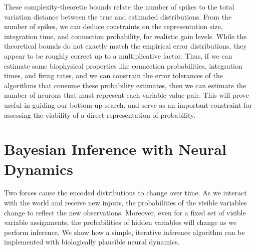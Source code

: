 These complexity-theoretic bounds relate the number of spikes to the 
total variation distance between the true and estimated distributions.
From the number of spikes, we can deduce constraints on the representation
size, integration time, and connection probability, for realistic gain levels.
While the theoretical bounds do not exactly match the empirical error 
distributions, they appear to be roughly correct up to a multiplicative 
factor. Thus, if we can estimate some biophysical properties like 
connection probabilities, integration times, and firing rates, 
and we can constrain the error 
tolerances of the algorithms that consume these probability estimates, 
then we can estimate the number of neurons that must represent 
each variable-value pair. This will prove useful in guiding our 
bottom-up search, and serve as an important constraint for assessing 
the viability of a direct representation of probability.


\section{Bayesian Inference with Neural Dynamics}
\label{sec:inference}
Two forces cause the encoded distributions to change over time. As
we interact with the world and receive new inputs, the probabilities
of the visible variables change to reflect the new
observations. Moreover, even for a fixed set of visible variable
assignments, the probabilities of hidden variables will change as we
perform inference.
We show how a simple, iterative inference algorithm can be
implemented with biologically plausible neural dynamics.

